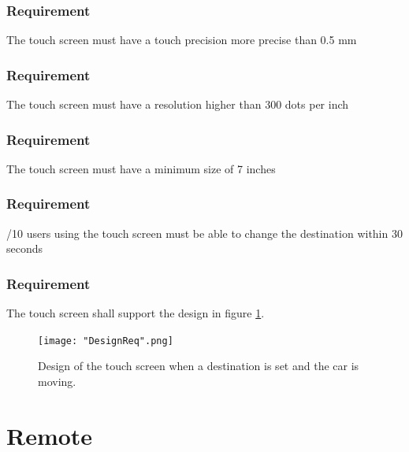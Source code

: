 \documentclass{article}
\begin{document}
{      \subsubsection{Requirement}
\hfill \break 
\- \- \-The touch screen must have a touch precision more precise than 0.5 mm
      \subsubsection{Requirement}
\hfill \break 
\- \- \-The touch screen must have a resolution higher than 300 dots per inch
      \subsubsection{Requirement}
\hfill \break 
\- \- \-The touch screen must have a minimum size of 7 inches
      \subsubsection{Requirement}
\hfill \break 
\- \- /10 users using the touch screen must be able to change the destination within 30 seconds
      \subsubsection{Requirement}
\hfill \break 
\- \- \-The touch screen shall support the design in figure \ref{fi:designmockup}.
\bigskip
\begin{figure}[htb]    
 \centering
  \texttt{[image: "DesignReq".png]}
  \caption{Design of the touch screen when a destination is set and the car is moving.}
  \label{fi:designmockup}
\end{figure}


\section{Remote}
}
\end{document}
